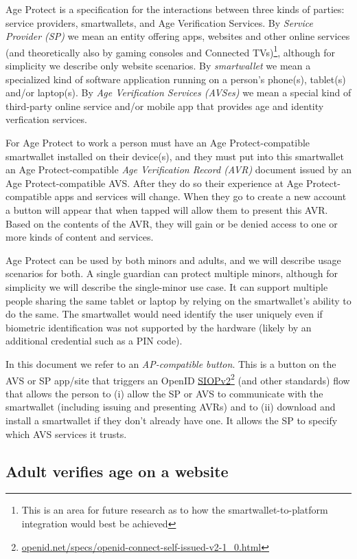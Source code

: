 \documentclass[11pt, oneside]{article}   	%
\newcommand{\hyperfootnote}[1][]{\def\ArgI{{#1}}\hyperfootnoteRelay}
\newcommand\hyperfootnoteRelay[2][]{\href{#1#2}{\ArgI}\footnote{\href{#1#2}{#2}}}
\begin{document}
Age Protect is a specification for the interactions between three kinds of parties: service providers, smartwallets, and Age Verification Services. By \emph{Service Provider (SP)} we mean an entity offering apps, websites and other online services (and theoretically also by gaming consoles and Connected TVs)\footnote{This is an area for future research as to how the smartwallet-to-platform integration would best be achieved}, although for simplicity we describe only website scenarios. By \emph{smartwallet} we mean a specialized kind of software application running on a person's phone(s), tablet(s) and/or laptop(s). By \emph{Age Verification Services (AVSes)} we mean a special kind of third-party online service and/or mobile app that provides age and identity verfication services. 

For Age Protect to work a person must have an Age Protect-compatible smartwallet installed on their device(s), and they must put into this smartwallet an Age Protect-compatible \emph{Age Verification Record (AVR)} document issued by an Age Protect-compatible AVS. After they do so their experience at Age Protect-compatible apps and services will change. When they go to create a new account a button will appear that when tapped will allow them to present this AVR. Based on the contents of the AVR, they will gain or be denied access to one or more kinds of content and services. 

Age Protect can be used by both minors and adults, and we will describe usage scenarios for both. A single guardian can protect multiple minors, although for simplicity we will describe the single-minor use case. It can support multiple people sharing the same tablet or laptop by relying on the smartwallet's ability to do the same. The smartwallet would need identify the user uniquely even if biometric identification was not supported by the hardware (likely by an additional credential such as a PIN code).

In this document we refer to an \emph{AP-compatible button}. This is a button on the AVS or SP app/site that triggers an OpenID \hyperfootnote[SIOPv2][https://]{openid.net/specs/openid-connect-self-issued-v2-1\_0.html} (and other standards) flow that allows the person to (i) allow the SP or AVS to communicate with the smartwallet (including issuing and presenting AVRs) and to (ii) download and install a smartwallet if they don't already have one. It allows the SP to specify which AVS services it trusts.

\subsection{Adult verifies age on a website}
\end{document}
